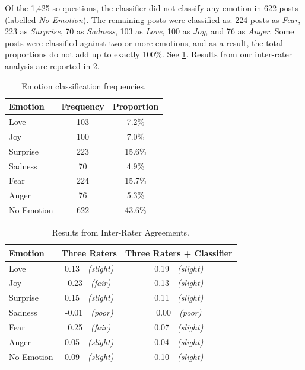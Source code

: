 Of the 1,425 \gls{so} questions, the classifier did not classify any emotion in 622 posts (labelled \textit{No Emotion}). The remaining posts were classified as: 224 posts as \textit{Fear}, 223 as \textit{Surprise}, 70 as \textit{Sadness}, 103 as \textit{Love}, 100 as \textit{Joy}, and 76 as \textit{Anger}. Some posts were classified against two or more emotions, and as a result, the total proportions do not add up to exactly 100\%. See \cref{caise2021:tab:emotion-freqs}.  Results from our inter-rater analysis are reported in \cref{caise2021:tab:reliability-analysis}.


\begin{table}
    \caption[Emotion classification frequencies]{Emotion classification frequencies.}
    \centering
    \label{caise2021:tab:emotion-freqs}
    \small
    \begin{tabular}{l|cc}
    \toprule
    \textbf{Emotion}&
    \textbf{Frequency}&
    \textbf{Proportion}\\
    \midrule
   Love&103&7.2\%\\
   Joy&100&7.0\%\\
   Surprise&223&15.6\%\\
   Sadness&70&4.9\%\\
   Fear&224&15.7\%\\
   Anger&76&5.3\%\\
   No Emotion&622&43.6\%\\
    \bottomrule
    \end{tabular}
    \end{table}
   \begin{table}
   \caption[Reliability Analysis of Emotion Classification]{Results from Inter-Rater Agreements.}
   \centering
   \label{caise2021:tab:reliability-analysis}
   \small
   \begin{tabular}{l|cc}
   \toprule
   \textbf{Emotion}&
   \textbf{Three Raters}&
   \textbf{Three Raters + Classifier}\\
   \midrule
   Love&0.13~~\textit{(slight)}&0.19~~\textit{(slight)}\\
   Joy&0.23~~\textit{(fair)}&0.13~~\textit{(slight)}\\
   Surprise&0.15~~\textit{(slight)} &0.11~~\textit{(slight)}\\
   Sadness&-0.01~~\textit{(poor)}&0.00~~\textit{(poor)}\\
   Fear&0.25~~\textit{(fair)}&0.07~~\textit{(slight)}\\
   Anger&0.05~~\textit{(slight)}&0.04~~\textit{(slight)}\\
   No Emotion&0.09~~\textit{(slight)}&0.10~~\textit{(slight)}\\
   \bottomrule
   \end{tabular}
   \end{table}

